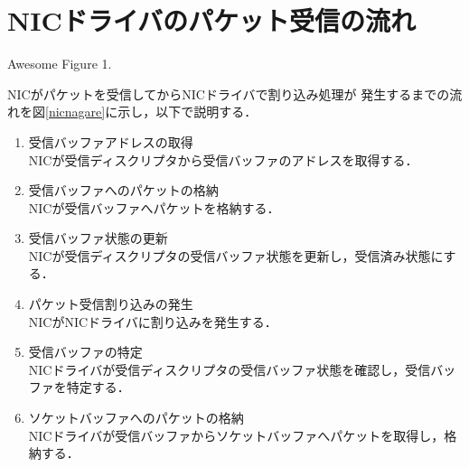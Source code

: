 \documentclass[tanilab-enum]{graduate}
\begin{document}
\section{NICドライバのパケット受信の流れ}
{Awesome Figure 1.}

NICがパケットを受信してからNICドライバで割り込み処理が
発生するまでの流れを図\ref{nicnagare}に示し，以下で説明する．
\begin{enumerate}
    \item 受信バッファアドレスの取得\\
        NICが受信ディスクリプタから受信バッファのアドレスを取得する．
    \item 受信バッファへのパケットの格納\\
        NICが受信バッファへパケットを格納する．
    \item 受信バッファ状態の更新\\
        NICが受信ディスクリプタの受信バッファ状態を更新し，受信済み状態にする．
    \item パケット受信割り込みの発生\\
        NICがNICドライバに割り込みを発生する．
    \item 受信バッファの特定\\
        NICドライバが受信ディスクリプタの受信バッファ状態を確認し，受信バッファを特定する．
    \item ソケットバッファへのパケットの格納\\
        NICドライバが受信バッファからソケットバッファへパケットを取得し，格納する．
\end{enumerate}

       
\end{document}

